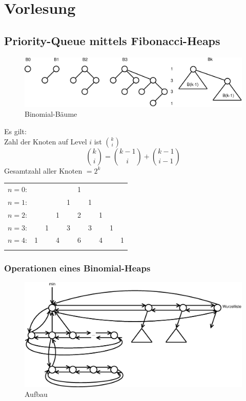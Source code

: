 \chapter{Vorlesung}
\section{Priority-Queue mittels Fibonacci-Heaps}
\begin{figure}[h]
	\centering
	\includegraphics[width=0.65\linewidth]{21/Grafik/BinomialBaeume}
	\caption{Binomial-Bäume}
\end{figure}

Es gilt:\\
Zahl der Knoten auf Level $i$ ist $\binom{k}{i}$
\[  \binom{k}{i} = \binom{k-1}{i} + \binom{k-1}{i-1} \]
Gesamtzahl aller Knoten $=2^k$\\

\begin{tabular}{rccccccccc}
$n=0$:&    &    &    &    &  1\\\noalign{\smallskip\smallskip}
$n=1$:&    &    &    &  1 &    &  1\\\noalign{\smallskip\smallskip}
$n=2$:&    &    &  1 &    &  2 &    &  1\\\noalign{\smallskip\smallskip}
$n=3$:&    &  1 &    &  3 &    &  3 &    &  1\\\noalign{\smallskip\smallskip}
$n=4$:&  1 &    &  4 &    &  6 &    &  4 &    &  1\\\noalign{\smallskip\smallskip}
\end{tabular}


\subsection{Operationen eines Binomial-Heaps}

\begin{figure}[h]
	\centering
	\includegraphics[width=0.65\linewidth]{21/Grafik/Aufbau}
	\caption{Aufbau}
\end{figure}

